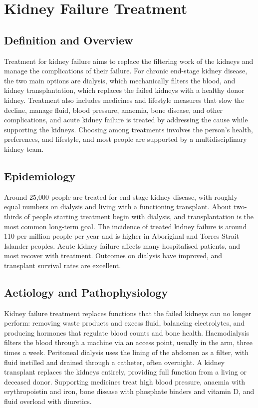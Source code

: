 \chapter{Kidney Failure Treatment}

\section*{Definition and Overview}
Treatment for kidney failure aims to replace the filtering work of the kidneys and manage the complications of their failure. For chronic end-stage kidney disease, the two main options are dialysis, which mechanically filters the blood, and kidney transplantation, which replaces the failed kidneys with a healthy donor kidney. Treatment also includes medicines and lifestyle measures that slow the decline, manage fluid, blood pressure, anaemia, bone disease, and other complications, and acute kidney failure is treated by addressing the cause while supporting the kidneys. Choosing among treatments involves the person's health, preferences, and lifestyle, and most people are supported by a multidisciplinary kidney team.

\section*{Epidemiology}
Around 25,000 people are treated for end-stage kidney disease, with roughly equal numbers on dialysis and living with a functioning transplant. About two-thirds of people starting treatment begin with dialysis, and transplantation is the most common long-term goal. The incidence of treated kidney failure is around 110 per million people per year and is higher in Aboriginal and Torres Strait Islander peoples. Acute kidney failure affects many hospitalised patients, and most recover with treatment. Outcomes on dialysis have improved, and transplant survival rates are excellent.

\section*{Aetiology and Pathophysiology}
Kidney failure treatment replaces functions that the failed kidneys can no longer perform: removing waste products and excess fluid, balancing electrolytes, and producing hormones that regulate blood counts and bone health. Haemodialysis filters the blood through a machine via an access point, usually in the arm, three times a week. Peritoneal dialysis uses the lining of the abdomen as a filter, with fluid instilled and drained through a catheter, often overnight. A kidney transplant replaces the kidneys entirely, providing full function from a living or deceased donor. Supporting medicines treat high blood pressure, anaemia with erythropoietin and iron, bone disease with phosphate binders and vitamin D, and fluid overload with diuretics.

